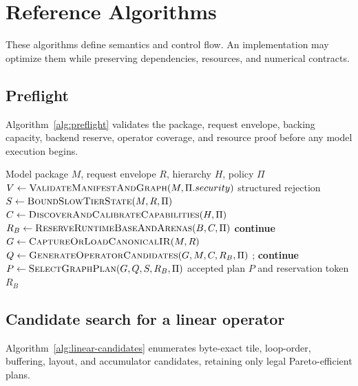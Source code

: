 \section{Reference Algorithms}
\label{app:algorithms}

These algorithms define semantics and control flow. An implementation may optimize them while preserving dependencies, resources, and numerical contracts.

\subsection{Preflight}

Algorithm~\ref{alg:preflight} validates the package, request envelope, backing capacity, backend reserve, operator coverage, and resource proof before any model execution begins.

\begin{algorithm}[H]
\caption{Model and request preflight}
\label{alg:preflight}
\begin{algorithmic}[1]
\Require Model package $M$, request envelope $R$, hierarchy $H$, policy $\Pi$
\State $V\gets\Call{ValidateManifestAndGraph}{M,\Pi.security}$
 \State \Return structured rejection \EndIf
\State $S\gets\Call{BoundSlowTierState}{M,R,\Pi}$
 \State \Return {} \EndIf
\State $C\gets\Call{DiscoverAndCalibrateCapabilities}{H,\Pi}$
  \State $R_B\gets\Call{ReserveRuntimeBaseAndArenas}{B,C,\Pi}$
   \State \textbf{continue} \EndIf
  \State $G\gets\Call{CaptureOrLoadCanonicalIR}{M,R}$
  \State $Q\gets\Call{GenerateOperatorCandidates}{G,M,C,R_B,\Pi}$
   \State {}; \textbf{continue} \EndIf
  \State $P\gets\Call{SelectGraphPlan}{G,Q,S,R_B,\Pi}$
    \State \Return accepted plan $P$ and reservation token $R_B$
  \EndIf
  \State {}
\EndFor
\State \Return {}
\end{algorithmic}
\end{algorithm}

\subsection{Candidate search for a linear operator}

Algorithm~\ref{alg:linear-candidates} enumerates byte-exact tile, loop-order, buffering, layout, and accumulator candidates, retaining only legal Pareto-efficient plans.


